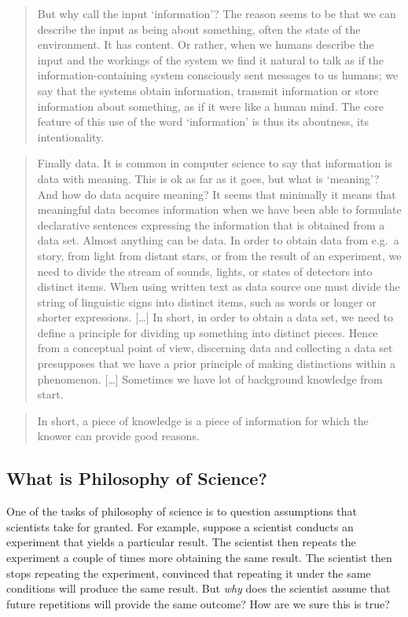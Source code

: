 \documentclass[
]{book}
\begin{document}
\begin{quote}
But why call the input `information'? The reason seems to be that we can describe the input as being about something, often the state of the environment. It has content. Or rather, when we humans describe the input and the workings of the system we find it natural to talk as if the information-containing system consciously sent messages to us humans; we say that the systems obtain information, transmit information or store information about something, as if it were like a human mind. The core feature of this use of the word `information' is thus its aboutness, its intentionality.
\end{quote}

\begin{quote}
Finally data. It is common in computer science to say that information is data with meaning. This is ok as far as it goes, but what is `meaning'? And how do data acquire meaning? It seems that minimally it means that meaningful data becomes information when we have been able to formulate declarative sentences expressing the information that is obtained from a data set. Almost anything can be data. In order to obtain data from e.g.~a story, from light from distant stars, or from the result of an experiment, we need to divide the stream of sounds, lights, or states of detectors into distinct items. When using written text as data source one must divide the string of linguistic signs into distinct items, such as words or longer or shorter expressions. {[}\ldots{]} In short, in order to obtain a data set, we need to define a principle for dividing up something into distinct pieces. Hence from a conceptual point of view, discerning data and collecting a data set presupposes that we have a prior principle of making distinctions within a phenomenon. {[}\ldots{]} Sometimes we have lot of background knowledge from start.
\end{quote}

\begin{quote}
In short, a piece of knowledge is a piece of information for which the knower can provide good reasons.
\end{quote}

\hypertarget{what-is-philosophy-of-science}{%
\subsection{What is Philosophy of Science?}\label{what-is-philosophy-of-science}}

One of the tasks of philosophy of science is to question assumptions that scientists take for granted. For example, suppose a scientist conducts an experiment that yields a particular result. The scientist then repeats the experiment a couple of times more obtaining the same result. The scientist then stops repeating the experiment, convinced that repeating it under the same conditions will produce the same result. But \emph{why} does the scientist assume that future repetitions will provide the same outcome? How are we sure this is true?
\end{document}
